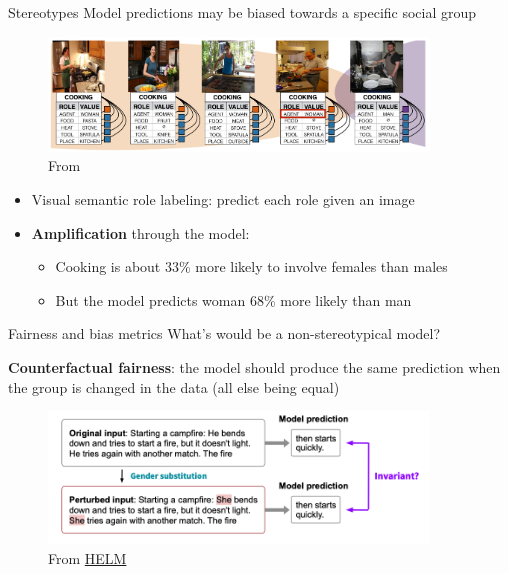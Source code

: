 \documentclass[usenames,dvipsnames,notes,11pt,aspectratio=169,hyperref={colorlinks=true, linkcolor=blue}]{beamer}
\begin{document}
\begin{frame}
    {Stereotypes}
    Model predictions may be biased towards a specific social group\vspace{-1em}
    \begin{figure}
        \includegraphics[width=0.9\textwidth]{figures/visual-gender}
        \caption{From }
    \end{figure}
    \vspace{-2em}
    \begin{itemize}
        \item Visual semantic role labeling: predict each role given an image
        \item \textbf{Amplification} through the model:
            \begin{itemize}
                \item Cooking is about 33\% more likely to involve females than males
                \item But the model predicts woman 68\% more likely than man
            \end{itemize}
    \end{itemize}
\end{frame}

\begin{frame}
    {Fairness and bias metrics}
    What's would be a non-stereotypical model?\pause %

    \pause
    \textbf{Counterfactual fairness}: the model should produce the same prediction when the group is changed in the data (all else being equal)\\
    \begin{figure}
        \includegraphics[width=0.9\textwidth]{figures/counterfactual-fairness}
        \caption{From \href{https://arxiv.org/pdf/2211.09110.pdf}{HELM}}
    \end{figure}
\end{frame}
\end{document}
